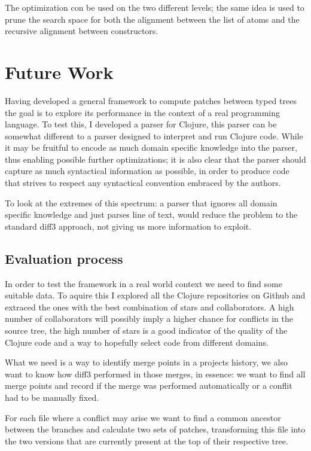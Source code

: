 \documentclass[11pt]{article}
\begin{document}
The optimization con be used on the two different levels; the same idea is used to prune the search space 
for both the alignment between the list of atoms and the recursive alignment between constructors.

\section{Future Work}\label{future work}

Having developed a general framework to compute patches between typed trees the 
goal is to explore its performance in the context of a real programming 
language.
To test this, I developed a parser for Clojure, this parser can be somewhat 
different to a parser designed to interpret and run Clojure code. While it may 
be fruitful to encode as much domain specific knowledge into the parser, thus 
enabling possible further optimizations; it is also clear that the parser should 
capture as much syntactical information as possible, in order to produce code 
that strives to respect any syntactical convention embraced by the authors.

To look at the extremes of this spectrum: a parser that ignores all domain
specific knowledge and just parses line of text, would reduce the problem to the 
standard diff3 approach, not giving us more information to exploit.

\subsection{Evaluation process}

In order to test the framework in a real world context we need to find some suitable data. To aquire this I 
explored all the Clojure repositories on Github and extraced the ones with the best combination of 
stars and collaborators. A high number of collaborators will possibly imply a higher chance for conflicts in
the source tree, the high number of stars is a good indicator of the quality of 
the Clojure code and a way to hopefully select code from different domains.

What we need is a way to identify merge points in a projects history, we also 
want to know how diff3 performed in those merges, in essence: we want to find all 
merge points and record if the merge was performed automatically or a conflit 
had to be manually fixed.

For each file where a conflict may arise we want to find a common ancestor 
between the branches and calculate two sets of patches, transforming this file 
into the two versions that are currently present at the top of their respective 
tree. 
\end{document}
